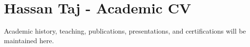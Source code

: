 \documentclass[11pt,a4paper]{article}
\begin{document}
\section*{Hassan Taj - Academic CV}
Academic history, teaching, publications, presentations, and certifications will be maintained here.
\end{document}
